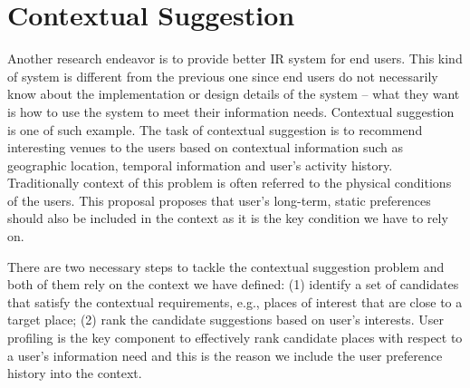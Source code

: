 \section{Contextual Suggestion}
Another research endeavor is to provide better IR system for 
end users. This kind of system is different from the previous one since end 
users do not necessarily know about the implementation or design details of 
the system -- what they want is how to use the system to meet their information 
needs. Contextual suggestion is one of such example. 
The task of contextual suggestion is to recommend interesting venues to the 
users based on contextual information such as geographic location, 
temporal information and user's activity history. Traditionally context of 
this problem is often referred to the physical conditions of the users. 
This proposal proposes that user's long-term, static preferences should also 
be included in the context as it is the key condition we have to rely on.

There are two necessary steps to tackle the contextual suggestion problem 
and both of them rely on the context we have defined: 
(1) identify a set of candidates that satisfy the contextual 
requirements, e.g., places of interest that are close to a target place; 
(2) rank the candidate suggestions based on user's interests. 
User profiling is the key component to effectively rank candidate places 
with respect to a user's information need and this is the reason we include 
the user preference history into the context. 

